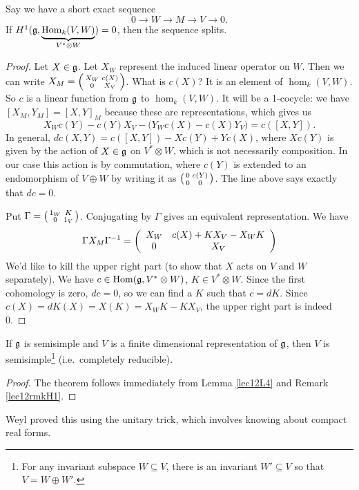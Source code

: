  \begin{lemma}\label{lec12L4}
   Say we have a short exact sequence
   \[
    0\to W\to M\to V\to 0.
   \]
   If $H^1(\mathfrak{g},\underbrace{\operatorname{Hom}_k(V,W)}_{V^*\otimes W})=0$, then the sequence splits.
 \end{lemma}
 \begin{proof}
   Let $X\in \mathfrak{g}$. Let $X_W$ represent the induced linear operator on $W$. Then we can write
   $X_M = \left( \begin{smallmatrix} X_W & c(X) \\ 0 & X_V \end{smallmatrix} \right)$. What is $c(X)$? It is an element of
   $\hom_k(V,W)$. So $c$ is a linear function from $\mathfrak{g}$ to $\hom_k(V,W)$. It will be a
   1-cocycle: we have $[X_M,Y_M]=[X,Y]_M$ because these are representations, which
   gives us
   \[
    X_W c(Y) - c(Y)X_V - \bigl(Y_W c(X) - c(X)Y_V\bigr) = c([X,Y]).
   \]
   In general, $dc(X,Y) = c([X,Y]) - X c(Y) + Y c(X)$, where $X c(Y)$ is given by the
   action of $X \in \mathfrak{g}$ on $V^*\otimes W$, which is not necessarily composition.
   In our case this action is by commutation, where $c(Y)$ is
   extended to an endomorphism of $V \oplus W$ by writing it as
   $\left( \begin{smallmatrix} 0 & c(Y) \\ 0 & 0 \end{smallmatrix} \right)$.  The line above says exactly that $dc=0$.

   Put $\Gamma = \left( \begin{smallmatrix} 1_W & K \\ 0 & 1_V \end{smallmatrix} \right)$.  Conjugating by $\Gamma$ gives an equivalent
   representation.  We have
   \[
   \Gamma X_M \Gamma^{-1} = \left( \begin{array}{cccccccccccccccccccccccccccc} X_W & c(X) + KX_V - X_W K\\ 0 & X_V \end{array}\right)
   \]
   We'd like to kill the upper right part (to show that $X$ acts on $V$ and $W$
   separately). We have $c\in \operatorname{Hom}(\mathfrak{g},V^*\otimes W)$, $K\in V^*\otimes W$.
   Since the first cohomology is zero, $dc=0$, so we can find a $K$ such that $c=dK$.
   Since $c(X) = dK(X) = X(K) = X_W K- KX_V$, the upper right part
   is indeed 0.
 \end{proof}
 \begin{theorem}[Weyl] \label{lec12Weyl}  
   If $\mathfrak{g}$ is semisimple and $V$ is a finite dimensional representation of $\mathfrak{g}$, then $V$
   is semisimple\footnote{For any invariant subspace $W\subseteq V$, there is
   an invariant $W'\subseteq V$ so that $V=W\oplus W'$.} (i.e.\ completely
   reducible).
 \end{theorem}
 \begin{proof}
   The theorem follows immediately from Lemma \ref{lec12L4} and Remark \ref{lec12rmkH1}.
 \end{proof}
 Weyl proved this using the unitary trick, which involves knowing
 about compact real forms.


